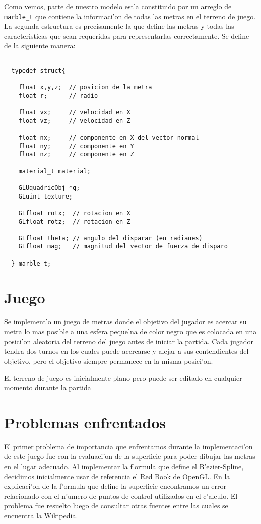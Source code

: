 \documentclass[10pt,letterpaper]{article}
\begin{document}
Como vemos, parte de nuestro modelo est'a constituido por un arreglo de
\verb|marble_t| que contiene la informaci'on de todas las metras en el
terreno de juego. La segunda estructura es precisamente la que define
las metras y todas las caracteristicas que sean requeridas para
representarlas correctamente. Se define de la siguiente manera:
\begin{lstlisting}

  typedef struct{

    float x,y,z;  // posicion de la metra
    float r;      // radio 

    float vx;     // velocidad en X
    float vz;     // velocidad en Z

    float nx;     // componente en X del vector normal
    float ny;     // componente en Y
    float nz;     // componente en Z

    material_t material;

    GLUquadricObj *q;
    GLuint texture;

    GLfloat rotx;  // rotacion en X
    GLfloat rotz;  // rotacion en Z

    GLfloat theta; // angulo del disparar (en radianes)
    GLfloat mag;   // magnitud del vector de fuerza de disparo

  } marble_t;

\end{lstlisting}
\section{Juego}
Se implement'o un juego de metras donde el objetivo del jugador es
acercar su metra lo mas posible a una esfera peque'na de color negro
que es colocada en una posici'on aleatoria del terreno del juego antes
de iniciar la partida. Cada jugador tendra dos turnos en los cuales
puede acercarse y alejar a sus contendientes del objetivo, pero el
objetivo siempre permanece en la misma posici'on.

El terreno de juego es inicialmente plano pero puede ser editado en
cualquier momento durante la partida
\section{Problemas enfrentados}
El primer problema de importancia que enfrentamos durante la
implementaci'on de este juego fue con la evaluaci'on de la superficie
para poder dibujar las metras en el lugar adecuado. Al implementar la
f'ormula que define el B'ezier-Spline, decidimos inicialmente usar de
referencia el Red Book de OpenGL\cite{redbook}. En la explicaci'on de
la f'ormula que define la superficie encontramos un error relacionado
con el n'umero de puntos de control utilizados en el c'alculo. El
problema fue resuelto luego de consultar otras fuentes entre las
cuales se encuentra la Wikipedia\cite{wikibezier}.
\end{document}
